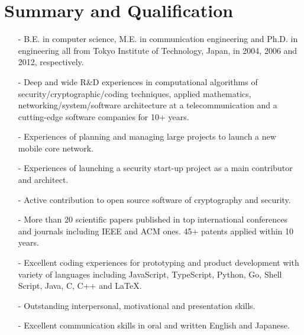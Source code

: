\section*{Summary and Qualification}
\begin{itemize}
 \item[-] B.E. in computer science, M.E. in communication engineering and Ph.D. in engineering all from Tokyo Institute of Technology, Japan, in 2004, 2006 and 2012, respectively.
 \item[-] Deep and wide R\&D experiences in computational algorithms of security/cryptographic/coding techniques, applied mathematics, networking/system/software architecture at a telecommunication and a cutting-edge software companies for 10+ years.
 \item[-] Experiences of planning and managing large projects to launch a new mobile core network.
 \item[-] Experiences of launching a security start-up project as a main contributor and architect.
 \item[-] Active contribution to open source software of cryptography and security.
 \item[-] More than 20 scientific papers published in top international conferences and journals including IEEE and ACM ones. 45+ patents applied within 10 years.
 \item[-] Excellent coding experiences for prototyping and product development with variety of languages including JavaScript, TypeScript, Python, Go, Shell Script, Java, C, C++ and LaTeX.
 \item[-] Outstanding interpersonal, motivational and presentation skills.
 \item[-] Excellent communication skills in oral and written English and Japanese.
\end{itemize}
